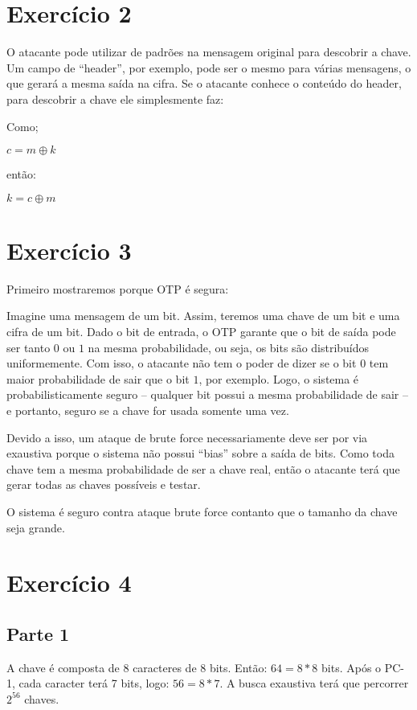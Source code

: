 \documentclass[a4paper]{article}
\begin{document}
\section{Exercício 2}\label{sec:Ex2}

O atacante pode utilizar de padrões na mensagem original para descobrir a chave. Um campo de ``header'', por exemplo, pode ser o mesmo para várias mensagens, o que gerará a
mesma saída na cifra. Se o atacante conhece o conteúdo do header, para descobrir a chave ele simplesmente faz:

Como;

$c = m \oplus k$

então:

$k = c \oplus m$

\section{Exercício 3}\label{sec:Ex3}

Primeiro mostraremos porque OTP é segura:

Imagine uma mensagem de um bit. Assim, teremos uma chave de um bit e uma cifra de um bit. Dado o bit de entrada, o OTP garante que o bit de saída pode ser tanto $0$ ou $1$ na mesma
probabilidade, ou seja, os bits são distribuídos uniformemente. Com isso, o atacante não tem o poder de dizer se o bit $0$ tem maior probabilidade de sair que o bit $1$,
por exemplo. Logo, o sistema é probabilisticamente seguro -- qualquer bit possui a mesma probabilidade de sair -- e portanto, seguro se a chave for usada somente uma vez.

Devido a isso, um ataque de brute force necessariamente deve ser por via exaustiva porque o sistema não possui “bias” sobre a saída de bits. Como toda chave tem a mesma probabilidade
de ser a chave real, então o atacante terá que gerar todas as chaves possíveis e testar.

O sistema é seguro contra ataque brute force contanto que o tamanho da chave seja grande.

\section{Exercício 4}\label{sec:Ex4}

\subsection{Parte 1}

A chave é composta de 8 caracteres de 8 bits. Então: $64 = 8 * 8$ bits. Após o PC-1, cada caracter terá 7 bits, logo: $56 = 8 * 7$. A busca exaustiva terá que percorrer $2^{56}$ chaves.
\end{document}
